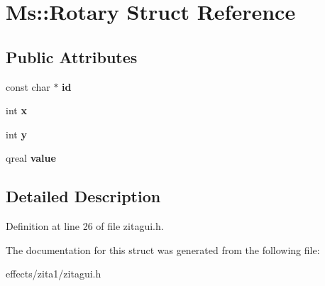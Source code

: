 \hypertarget{struct_ms_1_1_rotary}{}\section{Ms\+:\+:Rotary Struct Reference}
\label{struct_ms_1_1_rotary}
\subsection*{Public Attributes}
\begin{DoxyCompactItemize}
\item 
\mbox{\label{struct_ms_1_1_rotary_a2a733070ab38b7cc3dcfdb422d80b1e9}} 
const char $\ast$ {\bfseries id}
\item 
\mbox{\label{struct_ms_1_1_rotary_aaf65be482a66ac7ca1389abc960acedd}} 
int {\bfseries x}
\item 
\mbox{\label{struct_ms_1_1_rotary_aef8ec97ebeedce7d091ac22d59822e94}} 
int {\bfseries y}
\item 
\mbox{\label{struct_ms_1_1_rotary_a445ec2ceed24b778a24a0f8ee6f25e1f}} 
qreal {\bfseries value}
\end{DoxyCompactItemize}


\subsection{Detailed Description}


Definition at line 26 of file zitagui.\+h.



The documentation for this struct was generated from the following file\+:\begin{DoxyCompactItemize}
\item 
effects/zita1/zitagui.\+h\end{DoxyCompactItemize}
